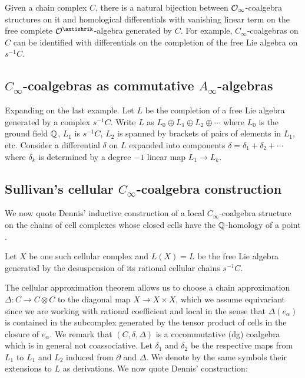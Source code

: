 Given a chain complex $C$, there is a natural bijection between $\mathcal{O}_\infty$-coalgebra structures on it and homological differentials with vanishing linear term on the free complete $\cO^\antishrik$-algebra generated by $C$.
For example, $C_\infty$-coalgebras on $C$ can be identified with differentials on the completion of the free Lie algebra on $s^{-1} C$.

\subsection{$C_\infty$-coalgebras as commutative $A_\infty$-algebras}

Expanding on the last example.
Let $L$ be the completion of a free Lie algebra generated by a complex $s^{-1}C$.
Write $L$ as $L_0 \oplus L_1 \oplus L_2 \oplus \dotsb $ where $L_0$ is the ground field $\mathbb{Q}$, $L_1$ is $s^{-1}C$, $L_2$ is spanned by brackets of pairs of elements in $L_1$, etc.
Consider a differential $\delta$ on $L$ expanded into components $\delta = \delta_1 + \delta_2 + \dotsb$ where $\delta_k$ is determined by a degree $-1$ linear map $L_1 \to L_k$.


\subsection{Sullivan's cellular $C_\infty$-coalgebra construction} \label{ss:dennis construction}

We now quote Dennis' inductive construction of a local $C_\infty$-coalgebra structure on the chains of cell complexes whose closed cells have the $\mathbb{Q}$-homology of a point \cite{sullivan2007appendix}.

Let $X$ be one such cellular complex and $L(X) = L$ be the free Lie algebra generated by the desuspension of its rational cellular chains $s^{-1}C$.

The cellular approximation theorem allows us to choose a chain approximation $\Delta \colon C \to C \otimes C$ to the diagonal map $X \to X \times X$, which we assume equivariant since we are working with rational coefficient and local in the sense that $\Delta(e_\alpha)$ is contained in the subcomplex generated by the tensor product of cells in the closure of $e_\alpha$.
We remark that $(C, \delta, \Delta)$ is a cocommutative (dg) coalgebra which is in general not coassociative.
Let $\delta_1$ and $\delta_2$ be the respective maps from $L_1$ to $L_1$ and $L_2$ induced from $\partial$ and $\Delta$.
We denote by the same symbols their extensions to $L$ as derivations.
We now quote Dennis' construction:

